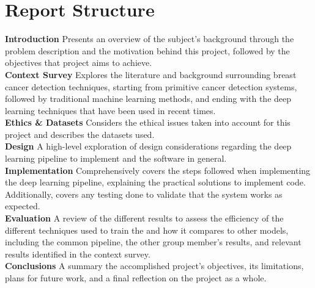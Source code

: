 \section{Report Structure}

\tab \textbf{Introduction} \space 
Presents an overview of the subject's background through the problem description and the motivation behind this project, followed by the objectives that project aims to achieve.\\

\textbf{Context Survey} \space
Explores the literature and background surrounding breast cancer detection techniques, starting from primitive cancer detection systems, followed by traditional machine learning methods, and ending with the deep learning techniques that have been used in recent times.\\

\textbf{Ethics \& Datasets} \space
Considers the ethical issues taken into account for this project and describes the datasets used.\\

\textbf{Design} \space
A high-level exploration of design considerations regarding the deep learning pipeline to implement and the software in general.\\

\textbf{Implementation} \space
Comprehensively covers the steps followed when implementing the deep learning pipeline, explaining the practical solutions to implement code. Additionally, covers any testing done to validate that the system works as expected.\\

\textbf{Evaluation} \space
A review of the different results to assess the efficiency of the different techniques used to train the and how it compares to other models, including the common pipeline, the other group member's results, and relevant results identified in the context survey.\\

\textbf{Conclusions} \space
A summary the accomplished project's objectives, its limitations, plans for future work, and a ﬁnal reflection on the project as a whole.